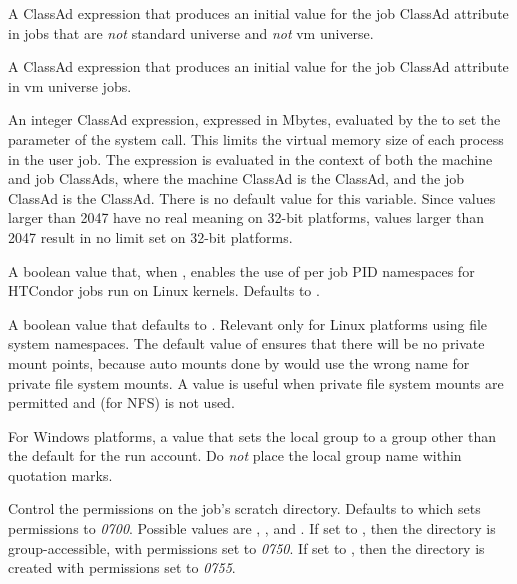 \begin{description}
\label{param:MemoryUsageMetric} 
\item[\Macro{MEMORY\_USAGE\_METRIC}]
  A ClassAd expression that produces an initial value for the job ClassAd
  attribute  in jobs that are \emph{not} standard 
  universe and \emph{not} vm universe.

\label{param:MemoryUsageMetricVM} 
\item[\Macro{MEMORY\_USAGE\_METRIC\_VM}]
  A ClassAd expression that produces an initial value for the job ClassAd
  attribute  in vm universe jobs.

\label{param:StarterRlimitAs} 
\item[ \Macro{STARTER\_RLIMIT\_AS}]
  An integer ClassAd expression, 
  expressed in Mbytes,
  evaluated by the  to set the  parameter
  of the  system call.
  This limits the virtual memory size of each process in the user job.  
  The expression is
  evaluated in the context of both the machine and job ClassAds,
  where the machine ClassAd is the  ClassAd,
  and the job ClassAd is the  ClassAd.
  There is no default value for this variable.
  Since values larger than 2047 have no real meaning on 32-bit platforms,
  values larger than 2047 result in no limit set on 32-bit platforms.

\label{param:UsePidNamespaces} 
\item[ \Macro{USE\_PID\_NAMESPACES}]
  A boolean value that, when , enables the use of per job PID
  namespaces for HTCondor jobs run on Linux kernels.
  Defaults to .

\label{param:PerJobNamespaces} 
\item[ \Macro{PER\_JOB\_NAMESPACES}]
  A boolean value that defaults to .
  Relevant only for Linux platforms using file system namespaces.
  The default value of  ensures that there will be no
  private mount points, because auto mounts done by  
  would use the wrong name for private file system mounts. 
  A  value is useful when private file system mounts are
  permitted and  (for NFS) is not used.

\label{param:DynamicRunAccountLocalGroup} 
\item[\Macro{DYNAMIC\_RUN\_ACCOUNT\_LOCAL\_GROUP}]
  For Windows platforms, a value that sets the local group to a group other 
  than the default  for the  run account.
  Do \emph{not} place the local group name within quotation marks.

\label{param:JobExecdirPermissions}
\item[\Macro{JOB\_EXECDIR\_PERMISSIONS}]
  Control the permissions on the job's scratch directory. Defaults to
   which sets permissions to \emph{0700}. Possible values are
  , , and . 
  If set to , then the directory is group-accessible, 
  with permissions set to \emph{0750}.
  If set to ,
  then the directory is created with permissions set to \emph{0755}.


\end{description}

